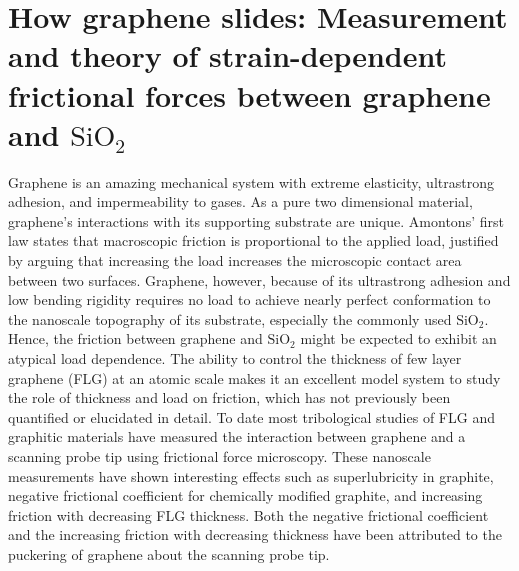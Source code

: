 \chapter{How graphene slides: Measurement and theory of strain-dependent frictional forces between graphene and $\mathrm{SiO_2}$\label{chap:fri}}

Graphene is an amazing mechanical system with extreme elasticity\cite{Lee2008}, ultrastrong adhesion\cite{Koenig2011}, and impermeability to gases\cite{Bunch2008}.
As a pure two dimensional material, graphene's interactions with its supporting substrate are unique.
Amontons' first law states that macroscopic friction is proportional to the applied load, justified by arguing that increasing the load increases the microscopic contact area between two surfaces\cite{Krim1996}.
Graphene, however, because of its ultrastrong adhesion\cite{Koenig2011} and low bending rigidity requires no load to achieve nearly perfect conformation to the nanoscale topography of its substrate, especially the commonly used $\mathrm{SiO_2}$\cite{Stolyarova2007,Lui2009,Cullen2010}.
Hence, the friction between graphene and $\mathrm{SiO_2}$ might be expected to exhibit an atypical load dependence.
The ability to control the thickness of few layer graphene (FLG) at an atomic scale makes it an excellent model system to study the role of thickness and load on friction, which has not previously been quantified or elucidated in detail.
To date most tribological studies of FLG and graphitic materials have measured the interaction between graphene and a scanning probe tip using frictional force microscopy\cite{Dienwiebel2004,Deng2012,Lee2010,Li2010c,Filleter2009,Filleter2010,Zhang2012a}.
These nanoscale measurements have shown interesting effects such as superlubricity in graphite\cite{Dienwiebel2004}, negative frictional coefficient for chemically modified graphite\cite{Deng2012}, and increasing friction with decreasing FLG thickness\cite{Lee2010,Li2010c,Filleter2009,Filleter2010}.
Both the negative frictional coefficient and the increasing friction with decreasing thickness have been attributed to the puckering of graphene about the scanning probe tip\cite{Lee2010,Li2010c,Deng2012}.

